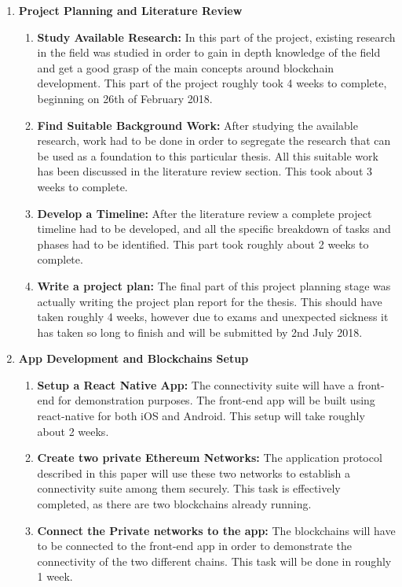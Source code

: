\documentclass[a4paper,twoside,phd]{BYUPhys}
\begin{document}
\begin{enumerate}
    \item \textbf{Project Planning and Literature Review}
    \begin{enumerate}
        \item \textbf{Study Available Research:} In this part of the project, existing research in the field was studied in order to gain in depth knowledge of the field and get a good grasp of the main concepts around blockchain development. This part of the project roughly took 4 weeks to complete, beginning on 26th of February 2018.
        \item \textbf{Find Suitable Background Work:} After studying the available research, work had to be done in order to segregate the research that can be used as a foundation to this particular thesis. All this suitable work has been discussed in the literature review section. This took about 3 weeks to complete.
        \item \textbf{Develop a Timeline:} After the literature review a complete project timeline had to be developed, and all the specific breakdown of tasks and phases had to be identified. This part took roughly about 2 weeks to complete.
        \item \textbf{Write a project plan:} The final part of this project planning stage was actually writing the project plan report for the thesis. This should have taken roughly 4 weeks, however due to exams and unexpected sickness it has taken so long to finish and will be submitted by 2nd July 2018.
    \end{enumerate}
    \item \textbf{App Development and Blockchains Setup}
    \begin{enumerate}
        \item \textbf{Setup a React Native App:} The connectivity suite will have a front-end for
        demonstration purposes. The front-end app will be built using react-native for both
        iOS and Android. This setup will take roughly about 2 weeks.
        \item \textbf{Create two private Ethereum Networks:} The application protocol described in this paper will use these two networks to establish a connectivity suite among them securely. This task is effectively completed, as there are two blockchains already running.
        \item \textbf{Connect the Private networks to the app:} The blockchains will have to be connected to the front-end app in order to demonstrate the connectivity of the two different chains. This task will be done in roughly 1 week.

\end{enumerate}
\end{enumerate}
\end{document}
